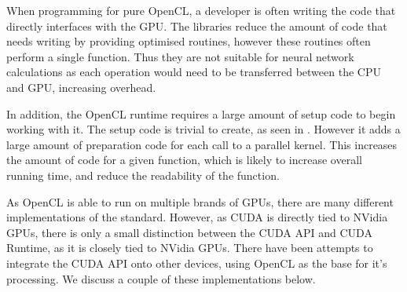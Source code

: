 

When programming for pure OpenCL, a developer is often writing the code that directly interfaces with the GPU.
The libraries reduce the amount of code that needs writing by providing optimised routines, however these routines often perform a single function.
Thus they are not suitable for neural network calculations as each operation would need to be transferred between the CPU and GPU, increasing overhead.




In addition, the OpenCL runtime requires a large amount of setup code to begin working with it.
The setup code is trivial to create, as seen in .
However it adds a large amount of preparation code for each call to a parallel kernel.
This increases the amount of code for a given function, which is likely to increase overall running time, and reduce the readability of the function.



As OpenCL is able to run on multiple brands of GPUs, there are many different implementations of the standard.
However, as CUDA is directly tied to NVidia GPUs, there is only a small distinction between the CUDA API and CUDA Runtime, as it is closely tied to NVidia GPUs.
There have been attempts to integrate the CUDA API onto other devices, using
OpenCL as the base for it's processing.
We discuss a couple of these implementations below.




